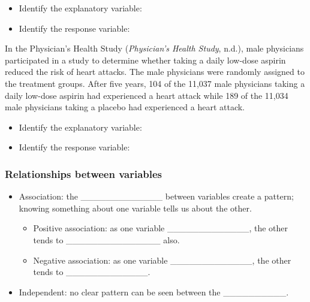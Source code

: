 \documentclass[
]{report}
\providecommand{\tightlist}{%
  \setlength{\itemsep}{0pt}\setlength{\parskip}{0pt}}
\begin{document}
\begin{itemize}
\tightlist
\item
  Identify the explanatory variable:
\end{itemize}

\vspace{0.25in}

\begin{itemize}
\tightlist
\item
  Identify the response variable:
\end{itemize}

\vspace{0.25in}

In the Physician's Health Study (\emph{Physician's Health Study}, n.d.), male physicians participated in a study to determine whether taking a daily low-dose aspirin reduced the risk of heart attacks. The male physicians were randomly assigned to the treatment groups. After five years, 104 of the 11,037 male physicians taking a daily low-dose aspirin had experienced a heart attack while 189 of the 11,034 male physicians taking a placebo had experienced a heart attack.

\begin{itemize}
\tightlist
\item
  Identify the explanatory variable:
\end{itemize}

\vspace{0.25in}

\begin{itemize}
\tightlist
\item
  Identify the response variable:
\end{itemize}

\vspace{0.25in}

\subsubsection*{Relationships between variables}\label{relationships-between-variables}


\begin{itemize}
\item
  Association: the \_\_\_\_\_\_\_\_\_\_\_\_\_ between variables create a pattern; knowing something about one variable tells us about the other.

  \begin{itemize}
  \item
    Positive association: as one variable \_\_\_\_\_\_\_\_\_\_\_\_\_, the other tends to \_\_\_\_\_\_\_\_\_\_\_\_\_\_\_ also.
  \item
    Negative association: as one variable \_\_\_\_\_\_\_\_\_\_\_\_\_, the other tends to \_\_\_\_\_\_\_\_\_\_\_\_\_.
  \end{itemize}
\item
  Independent: no clear pattern can be seen between the \_\_\_\_\_\_\_\_\_\_.
\end{itemize}
\end{document}
